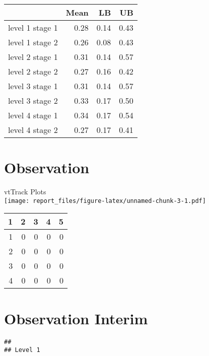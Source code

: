 \documentclass[]{article}
\begin{document}
\begin{table}[ht]
\centering
\begin{tabular}{rrrr}
  \hline
 & Mean & LB & UB \\ 
  \hline
level 1 stage 1 & 0.28 & 0.14 & 0.43 \\ 
  level 1 stage 2 & 0.26 & 0.08 & 0.43 \\ 
  level 2 stage 1 & 0.31 & 0.14 & 0.57 \\ 
  level 2 stage 2 & 0.27 & 0.16 & 0.42 \\ 
  level 3 stage 1 & 0.31 & 0.14 & 0.57 \\ 
  level 3 stage 2 & 0.33 & 0.17 & 0.50 \\ 
  level 4 stage 1 & 0.34 & 0.17 & 0.54 \\ 
  level 4 stage 2 & 0.27 & 0.17 & 0.41 \\ 
   \hline
\end{tabular}
\end{table}

\clearpage

\hypertarget{observation}{%
\section{Observation}\label{observation}}

vtTrack Plots\\
\texttt{[image: report\_files/figure-latex/unnamed-chunk-3-1.pdf]}

\begin{table}[ht]
\centering
\begin{tabular}{rrrrr}
  \hline
1 & 2 & 3 & 4 & 5 \\ 
  \hline
1 & 0 & 0 & 0 & 0 \\ 
  2 & 0 & 0 & 0 & 0 \\ 
  3 & 0 & 0 & 0 & 0 \\ 
  4 & 0 & 0 & 0 & 0 \\ 
   \hline
\end{tabular}
\end{table}

\clearpage

\hypertarget{observation-interim}{%
\section{Observation Interim}\label{observation-interim}}

\begin{verbatim}
## 
## Level 1
\end{verbatim}
\end{document}
